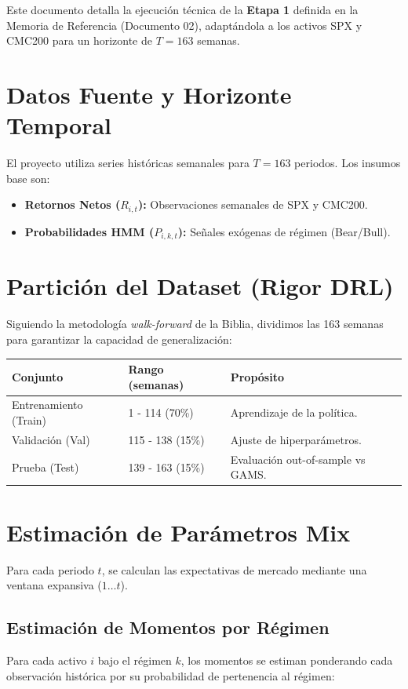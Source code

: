 \documentclass[12pt]{article}
\begin{document}
Este documento detalla la ejecución técnica de la \textbf{Etapa 1} definida en la Memoria de Referencia (Documento 02), adaptándola a los activos SPX y CMC200 para un horizonte de $T=163$ semanas.

\section{Datos Fuente y Horizonte Temporal}

El proyecto utiliza series históricas semanales para $T=163$ periodos. Los insumos base son:
\begin{itemize}
    \item \textbf{Retornos Netos ($R_{i,t}$):} Observaciones semanales de SPX y CMC200.
    \item \textbf{Probabilidades HMM ($P_{i,k,t}$):} Señales exógenas de régimen (Bear/Bull).
\end{itemize}

\section{Partición del Dataset (Rigor DRL)}

Siguiendo la metodología \textit{walk-forward} de la Biblia, dividimos las 163 semanas para garantizar la capacidad de generalización:

\begin{table}[h!]
\centering
\begin{tabular}{@{}lll@{}}
\toprule
\textbf{Conjunto} & \textbf{Rango (semanas)} & \textbf{Propósito} \\ \midrule
Entrenamiento (Train) & 1 - 114 (70\%) & Aprendizaje de la política. \\
Validación (Val) & 115 - 138 (15\%) & Ajuste de hiperparámetros. \\
Prueba (Test) & 139 - 163 (15\%) & Evaluación out-of-sample vs GAMS. \\ \bottomrule
\end{tabular}
\end{table}

\section{Estimación de Parámetros Mix}

Para cada periodo $t$, se calculan las expectativas de mercado mediante una ventana expansiva ($1 \dots t$).

\subsection{Estimación de Momentos por Régimen}
Para cada activo $i$ bajo el régimen $k$, los momentos se estiman ponderando cada observación histórica por su probabilidad de pertenencia al régimen:
\end{document}
